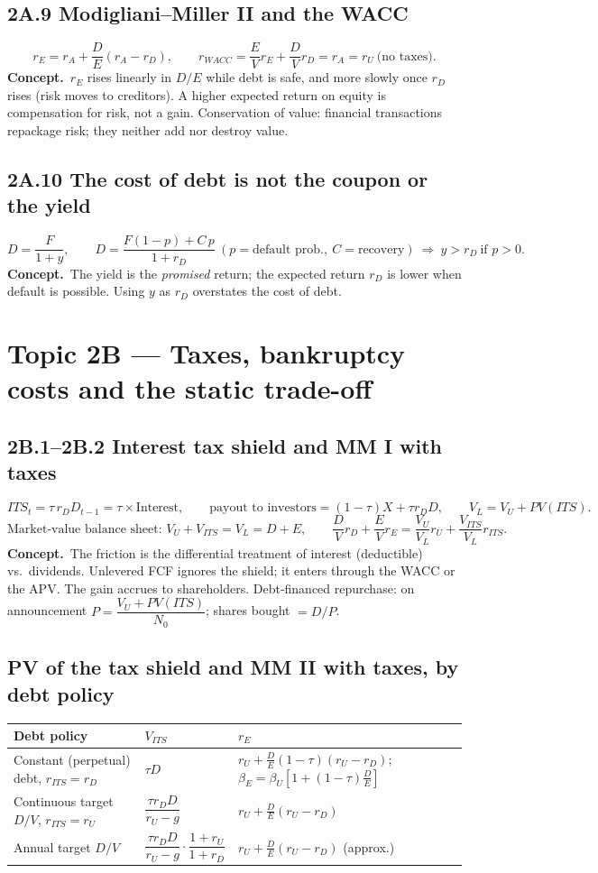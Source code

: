 \documentclass[10pt,a4paper]{article}
\newcommand{\blk}[1]{\subsection*{\color{blue!55!black}#1}}
\newcommand{\idea}{\textbf{Concept.}~}
\begin{document}
\blk{2A.9 Modigliani--Miller II and the WACC}
\[
r_E=r_A+\frac{D}{E}(r_A-r_D),\qquad r_{WACC}=\frac EV r_E+\frac DV r_D=r_A=r_U\ \text{(no taxes)}.
\]
\idea $r_E$ rises linearly in $D/E$ while debt is safe, and more slowly once $r_D$ rises (risk moves
to creditors). A higher expected return on equity is compensation for risk, not a gain.
Conservation of value: financial transactions repackage risk; they neither add nor destroy value.

\blk{2A.10 The cost of debt is not the coupon or the yield}
\[
D=\frac{F}{1+y},\qquad D=\frac{F(1-p)+C\,p}{1+r_D}\ (p=\text{default prob.},\ C=\text{recovery})
\ \Rightarrow\ y>r_D\ \text{if } p>0.
\]
\idea The yield is the \emph{promised} return; the expected return $r_D$ is lower when default is
possible. Using $y$ as $r_D$ overstates the cost of debt.

\section*{Topic 2B --- Taxes, bankruptcy costs and the static trade-off}

\blk{2B.1--2B.2 Interest tax shield and MM I with taxes}
\[
ITS_t=\tau\,r_D D_{t-1}=\tau\times\text{Interest},\qquad
\text{payout to investors}=(1-\tau)X+\tau r_D D,\qquad
\boxed{V_L=V_U+PV(ITS)}.
\]
\[
\text{Market-value balance sheet: } V_U+V_{ITS}=V_L=D+E,\qquad
\frac DV r_D+\frac EV r_E=\frac{V_U}{V_L}r_U+\frac{V_{ITS}}{V_L}r_{ITS}.
\]
\idea The friction is the differential treatment of interest (deductible) vs.\ dividends. Unlevered
FCF ignores the shield; it enters through the WACC or the APV. The gain accrues to shareholders.
Debt-financed repurchase: on announcement $P=\dfrac{V_U+PV(ITS)}{N_0}$; shares bought $=D/P$.

\blk{PV of the tax shield and MM II with taxes, by debt policy}
\begin{center}\small
\begin{tabular}{lll}
\hline
Debt policy & $V_{ITS}$ & $r_E$ \\ \hline
Constant (perpetual) debt, $r_{ITS}=r_D$ & $\tau D$ & $r_U+\frac DE(1-\tau)(r_U-r_D)$;\ \ $\beta_E=\beta_U[1+(1-\tau)\frac DE]$ \\
Continuous target $D/V$, $r_{ITS}=r_U$ & $\dfrac{\tau r_D D}{r_U-g}$ & $r_U+\frac DE(r_U-r_D)$ \\
Annual target $D/V$ & $\dfrac{\tau r_D D}{r_U-g}\cdot\dfrac{1+r_U}{1+r_D}$ & $r_U+\frac DE(r_U-r_D)$ (approx.) \\ \hline
\end{tabular}
\end{center}
\end{document}
